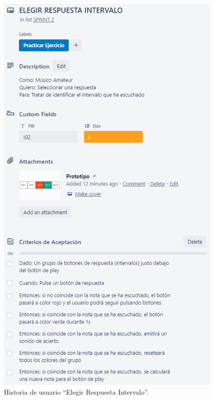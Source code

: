\documentclass[12pt,twoside,titlepage]{report}
\begin{document}
\begin{figure}[H]
    \centering
    \includegraphics[scale=1.3]{Scrum/User Stories/IntervalosRespuestas}
    \caption{Historia de usuario ``Elegir Respuesta Intervalo''.}
    \label{fig:IntervalosRespuestas}
\end{figure}
\end{document}
